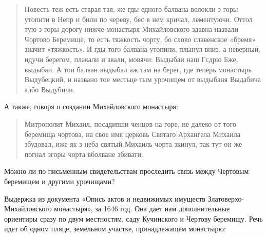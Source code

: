 \begin{quotation}
Повесть теж есть старая тая, же гды едного балвана волокли з горы утопити в Непр и били по череву, бес в нем кричал, лементуючи. Оттол тую з горы дорогу нижче монастыря Михайловского здавна назвали Чортово Беремище, то есть тяжкость чорту, бо слово славенское «бремя» значит «тяжкость». И гды того балвана утопили, плынул вниз, а неверныи, идучи берегом, плакали и звали, мовячи: Выдыбаи наш Гсдрю Бже, выдыбаи. А тои балван выдыбал аж там на берег, где теперь монастырь Выдубецкий, и названо тое местьце тым урочищем от выдыбаня Выдабича албо Выдубичи.
\end{quotation}

А также, говоря о создании Михайловского монастыря:

\begin{quotation}
Митрополит Михаил, посадивши ченцов на горе, не далеко от того беремища чортова, на свое имя церковь Святаго Архангела Михаила збудовал, иже як з неба святый Михаиль чорта зкинул, так тут он же погнал згоры чорта вболване збивати.
\end{quotation}





Можно ли по письменным свидетельствам проследить связь между Чертовым беремищем и другими урочищами? 

Выдержка из документа «Опись актов и недвижимых имуществ Златоверхо-Михайловского монастыря», за 1646 год. Она дает нам дополнительные ориентиры сразу по двум местностям, саду Кучинского и Чертову беремищу. Речь идет об одном пляце, земельном участке, принадлежащем монастырю:

